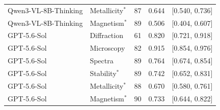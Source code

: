 \documentclass[11pt,a4paper]{article}
\begin{document}
\begin{table}[htbp]
{\begin{tabular}{l l S[table-format=3.0] S[table-format=1.3] c}
Qwen3-VL-8B-Thinking & Metallicity$^{*}$ & 87 & 0.644 & [0.540, 0.736] \\
Qwen3-VL-8B-Thinking & Magnetism$^{*}$ & 89 & 0.506 & [0.404, 0.607] \\
\addlinespace
GPT-5.6-Sol & Diffraction & 61 & 0.820 & [0.721, 0.918] \\
GPT-5.6-Sol & Microscopy & 82 & 0.915 & [0.854, 0.976] \\
GPT-5.6-Sol & Spectra & 89 & 0.764 & [0.674, 0.854] \\
GPT-5.6-Sol & Stability$^{*}$ & 89 & 0.742 & [0.652, 0.831] \\
GPT-5.6-Sol & Metallicity$^{*}$ & 88 & 0.670 & [0.580, 0.761] \\
GPT-5.6-Sol & Magnetism$^{*}$ & 90 & 0.733 & [0.644, 0.822] \\
\bottomrule
\end{tabular}}
\end{table}
\end{document}
